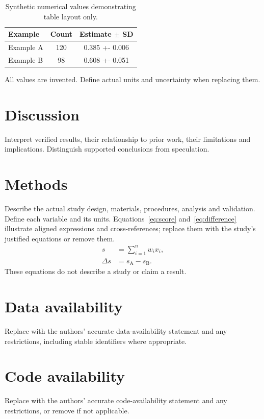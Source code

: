 \documentclass[11pt]{article}
\begin{document}
\begin{table}[htbp]
\centering\small
\caption{Synthetic numerical values demonstrating table layout only.}
\label{tab:comparison}
\begin{tabularx}{\linewidth}{@{}>{\raggedright\arraybackslash}X
 S[table-format=3.0] S[table-format=1.3(3)]@{}}
\toprule
Example & {Count} & {Estimate $\pm$ SD}\\
\midrule
Example A & 120 & 0.385 +- 0.006\\
Example B & 98 & 0.608 +- 0.051\\
\bottomrule
\end{tabularx}
\par\smallskip\footnotesize\raggedright
All values are invented. Define actual units and uncertainty when replacing them.
\end{table}

\section{Discussion}\label{sec:discussion}
Interpret verified results, their relationship to prior work, their limitations
and implications. Distinguish supported conclusions from speculation.

\section{Methods}\label{sec:methods}
Describe the actual study design, materials, procedures, analysis and
validation. Define each variable and its units. Equations~\eqref{eq:score}
and~\eqref{eq:difference} illustrate aligned expressions and cross-references;
replace them with the study's justified equations or remove them.
\begin{align}
 s &= \sum_{i=1}^{n} w_i x_i,\label{eq:score}\\
 \Delta s &= s_{\mathrm{A}}-s_{\mathrm{B}}.\label{eq:difference}
\end{align}
These equations do not describe a study or claim a result.

\section*{Data availability}
Replace with the authors' accurate data-availability statement and any
restrictions, including stable identifiers where appropriate.
\section*{Code availability}
Replace with the authors' accurate code-availability statement and any
restrictions, or remove if not applicable.
\end{document}
